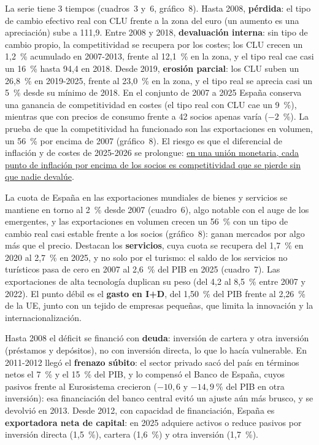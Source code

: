 \begin{examen}
La serie tiene 3 tiempos (cuadros~3 y~6, gráfico~8). Hasta 2008, \textbf{pérdida}: el tipo de cambio efectivo real con CLU frente a la zona del euro (un aumento es una apreciación) sube a 111,9. Entre 2008 y 2018, \textbf{devaluación interna}: sin tipo de cambio propio, la competitividad se recupera por los costes; los CLU crecen un 1,2~\% acumulado en 2007-2013, frente al 12,1~\% en la zona, y el tipo real cae casi un 16~\% hasta 94,4 en 2018. Desde 2019, \textbf{erosión parcial}: los CLU suben un 26,8~\% en 2019-2025, frente al 23,0~\% en la zona, y el tipo real se aprecia casi un 5~\% desde su mínimo de 2018. En el conjunto de 2007 a 2025 España conserva una ganancia de competitividad en costes (el tipo real con CLU cae un 9~\%), mientras que con precios de consumo frente a 42 socios apenas varía ($-2$~\%). La prueba de que la competitividad ha funcionado son las exportaciones en volumen, un 56~\% por encima de 2007 (gráfico~8). El riesgo es que el diferencial de inflación y de costes de 2025-2026 se prolongue: \uline{en una unión monetaria, cada punto de inflación por encima de los socios es competitividad que se pierde sin que nadie devalúe}.

La cuota de España en las exportaciones mundiales de bienes y servicios se mantiene en torno al 2~\% desde 2007 (cuadro~6), algo notable con el auge de los emergentes, y las exportaciones en volumen crecen un 56~\% con un tipo de cambio real casi estable frente a los socios (gráfico~8): ganan mercados por algo más que el precio. Destacan los \textbf{servicios}, cuya cuota se recupera del 1,7~\% en 2020 al 2,7~\% en 2025, y no solo por el turismo: el saldo de los servicios no turísticos pasa de cero en 2007 al 2,6~\% del PIB en 2025 (cuadro~7). Las exportaciones de alta tecnología duplican su peso (del 4,2 al 8,5~\% entre 2007 y 2022). El punto débil es el \textbf{gasto en I+D}, del 1,50~\% del PIB frente al 2,26~\% de la UE, junto con un tejido de empresas pequeñas, que limita la innovación y la internacionalización.

Hasta 2008 el déficit se financió con \textbf{deuda}: inversión de cartera y otra inversión (préstamos y depósitos), no con inversión directa, lo que lo hacía vulnerable. En 2011-2012 llegó el \textbf{frenazo súbito}: el sector privado sacó del país en términos netos el 7~\% y el 15~\% del PIB, y lo compensó el Banco de España, cuyos pasivos frente al Eurosistema crecieron ($-10{,}6$ y $-14{,}9~\%$ del PIB en otra inversión): esa financiación del banco central evitó un ajuste aún más brusco, y se devolvió en 2013. Desde 2012, con capacidad de financiación, España es \textbf{exportadora neta de capital}: en 2025 adquiere activos o reduce pasivos por inversión directa (1,5~\%), cartera (1,6~\%) y otra inversión (1,7~\%).


\end{examen}

